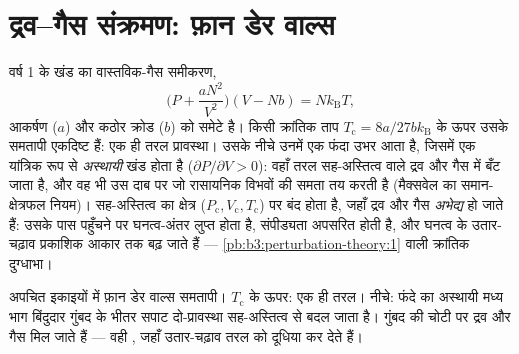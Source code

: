 \section{द्रव--गैस संक्रमण: फ़ान डेर वाल्स}

\begin{proposition}[फ़ान डेर वाल्स के समतापी]\label{prop:b3:phase-transitions:vdw}
वर्ष 1 के खंड का वास्तविक-गैस समीकरण,
\[
\Big(P + \frac{aN^2}{V^2}\Big)(V - Nb) = Nk_{\text{B}}T ,
\]
आकर्षण ($a$) और कठोर क्रोड ($b$) को समेटे है। किसी क्रांतिक
ताप $T_{\text{c}} = 8a/27bk_{\text{B}}$ के ऊपर उसके समतापी
एकदिष्ट हैं: एक ही तरल प्रावस्था। उसके नीचे उनमें एक फंदा उभर आता है,
जिसमें एक यांत्रिक रूप से \emph{अस्थायी} खंड होता है ($\partial P/\partial V >
0$): वहाँ तरल सह-अस्तित्व वाले द्रव और गैस में बँट जाता है, और वह भी
उस दाब पर जो रासायनिक विभवों की समता तय करती है (मैक्सवेल का
समान-क्षेत्रफल नियम)। सह-अस्तित्व का क्षेत्र 
($P_{\text{c}}, V_{\text{c}}, T_{\text{c}}$) पर बंद होता है, जहाँ
द्रव और गैस \emph{अभेद्य} हो जाते हैं: उसके पास पहुँचने पर
घनत्व-अंतर लुप्त होता है, संपीड्यता अपसरित होती है, और घनत्व के
उतार-चढ़ाव प्रकाशिक आकार तक बढ़ जाते हैं ---
\cref{pb:b3:perturbation-theory:1} वाली क्रांतिक दुग्धाभा।
\end{proposition}
\admitted

\begin{omfigure}

{\small अपचित इकाइयों में फ़ान डेर वाल्स समतापी।
$T_{\text{c}}$ के ऊपर: एक ही तरल। नीचे: फंदे का अस्थायी मध्य भाग
बिंदुदार गुंबद के भीतर सपाट दो-प्रावस्था सह-अस्तित्व से बदल जाता है।
गुंबद की चोटी पर द्रव और गैस मिल जाते हैं --- वही ,
जहाँ उतार-चढ़ाव तरल को दूधिया कर देते हैं।}
\end{omfigure}

